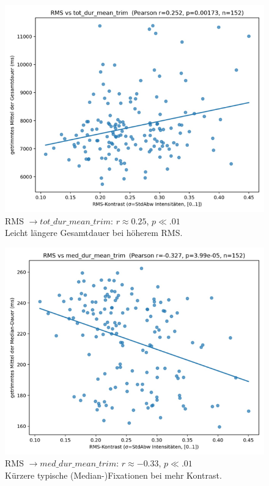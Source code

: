 \documentclass[
    language=german, %
    thesis=seminar, %
    supervisor=postdoc, %
    multiauthor=true, %
    ]{settings/csssa-thesis}
\begin{document}
\begin{figure}[h]
    \centering
    \includegraphics[width=\linewidth,height=0.8\textheight,keepaspectratio]{figures/Bild5.png}
    \caption{ RMS $\rightarrow tot\_dur\_mean\_trim$: $r \approx 0.25$, $p \ll .01$ \\
          Leicht längere Gesamtdauer bei höherem RMS. }\label{fig:bild5}
\end{figure}
\begin{figure}[h]
    \centering
    \includegraphics[width=\linewidth,height=0.8\textheight,keepaspectratio]{figures/Bild6.png}
    \caption{ RMS $\rightarrow med\_dur\_mean\_trim$: $r \approx -0.33$, $p \ll .01$ \\
          Kürzere typische (Median-)Fixationen bei mehr Kontrast. }\label{fig:bild6}
\end{figure}
\end{document}
